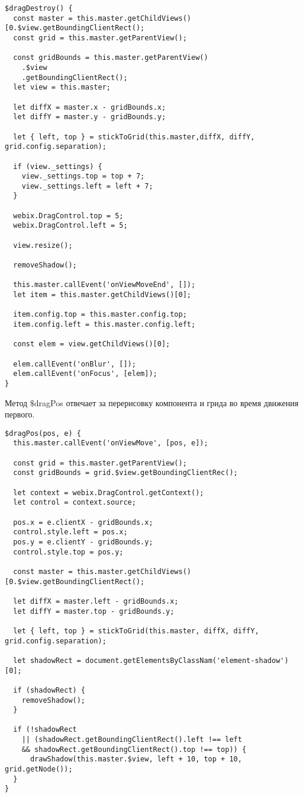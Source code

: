 \begin{lstlisting}
$dragDestroy() {
  const master = this.master.getChildViews()[0.$view.getBoundingClientRect();
  const grid = this.master.getParentView();

  const gridBounds = this.master.getParentView()
    .$view
    .getBoundingClientRect();
  let view = this.master;

  let diffX = master.x - gridBounds.x;
  let diffY = master.y - gridBounds.y;

  let { left, top } = stickToGrid(this.master,diffX, diffY, grid.config.separation);

  if (view._settings) {
    view._settings.top = top + 7;
    view._settings.left = left + 7;
  }

  webix.DragControl.top = 5;
  webix.DragControl.left = 5;

  view.resize();

  removeShadow();

  this.master.callEvent('onViewMoveEnd', []);
  let item = this.master.getChildViews()[0];

  item.config.top = this.master.config.top;
  item.config.left = this.master.config.left;

  const elem = view.getChildViews()[0];

  elem.callEvent('onBlur', []);
  elem.callEvent('onFocus', [elem]);
}
\end{lstlisting}

Метод $\$$dragPos отвечает за перерисовку компонента и грида во время движения первого. 

\begin{lstlisting}
$dragPos(pos, e) {
  this.master.callEvent('onViewMove', [pos, e]);

  const grid = this.master.getParentView();
  const gridBounds = grid.$view.getBoundingClientRec();

  let context = webix.DragControl.getContext();
  let control = context.source;

  pos.x = e.clientX - gridBounds.x;
  control.style.left = pos.x;
  pos.y = e.clientY - gridBounds.y;
  control.style.top = pos.y;

  const master = this.master.getChildViews()[0.$view.getBoundingClientRect();

  let diffX = master.left - gridBounds.x;
  let diffY = master.top - gridBounds.y;

  let { left, top } = stickToGrid(this.master, diffX, diffY, grid.config.separation);

  let shadowRect = document.getElementsByClassNam('element-shadow')[0];

  if (shadowRect) {
    removeShadow();
  }

  if (!shadowRect
    || (shadowRect.getBoundingClientRect().left !== left
    && shadowRect.getBoundingClientRect().top !== top)) {
      drawShadow(this.master.$view, left + 10, top + 10, grid.getNode());
  }
}
\end{lstlisting}

